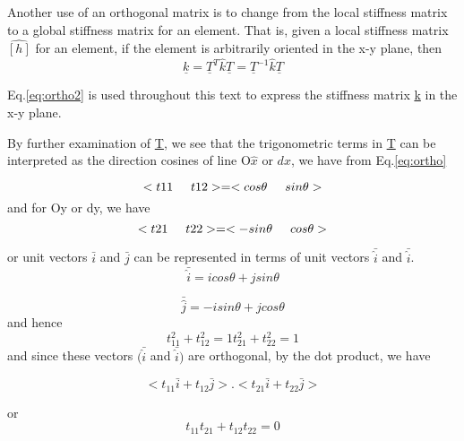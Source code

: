 \documentclass[12pt]{report}
\newcommand{\lab}[1]{
Eq.\ref{#1}
}
\begin{document}
Another use of an orthogonal matrix is to change from the local
stiffness matrix to a global stiffness matrix for an element. That is,
given a local stiffness matrix $\hat{[h]}$ for an element, if the
element is arbitrarily oriented in the x-y plane, then
\begin{equation}\underline{k}=\underline{T}^T \hat{k}\underline{T}=\underline{T}^{-1}\hat{k}\underline{T}\label{eq:ortho2}\end{equation}

\lab{eq:ortho2} is used throughout this text to express the
stiffness matrix \underline{k} in the x-y plane.

By further examination of \underline{T}, we see that the trigonometric terms in
\underline{T} can be interpreted as the direction cosines of line O$\hat{x}$ or
$d{x}$, we have from \lab{eq:ortho}

\begin{equation}<{t11}\hspace{0.5cm}{t12}>=<{cos\theta}\hspace{0.5cm}{sin\theta}>\end{equation}
and for Oy or dy, we have
\begin{equation}<{t21}\hspace{0.5cm}{t22}>=<{-sin\theta}\hspace{0.5cm}{cos\theta}>\end{equation}

or unit vectors $\bar{i}$ and $\bar{j}$ can be represented in terms of
unit vectors $\bar{\hat{i}}$ and $\bar{\hat{i}}$.
\begin{equation}\bar{\hat{i}} =icos\theta+jsin\theta\end{equation}

\begin{equation}\bar{\hat{j}} =-isin\theta+jcos\theta\end{equation}
and hence
\begin{equation}{t}^2_{11} + {t}^2_{12}=1 
{t}^2_{21} + {t}^2_{22}=1\end{equation}
and since these vectors $(\bar{\hat{i}}$ and $\bar{\hat{i}})$ are
orthogonal, by the dot product, we have


\begin{equation}<{t}_{11} \bar{i} + {t}_{12} \bar{j}>.<{t}_{21} \bar{i} +
{t}_{22} \bar{j}>\end{equation}

or \begin{equation}{t}_{11}{t}_{21} + {t}_{12} {t}_{22}=0\end{equation}
\end{document}
